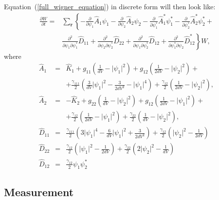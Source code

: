 \documentclass[12pt,notitlepage]{report}
\begin{document}
Equation~(\ref{full_wigner_equation}) in discrete form will then look like:
\begin{equation*}
\begin{split}
\frac{\partial W}{\partial t} = & \sum\limits_{\mathbf{r}} \left\{
	- \frac{\partial}{\partial \psi_1} \hat{A}_1 \psi_1 -
	\frac{\partial}{\partial \psi_2} \hat{A}_2 \psi_2 -
	\frac{\partial}{\partial \psi^*_1} \hat{A}^*_1 \psi^*_1 -
	\frac{\partial}{\partial \psi^*_2} \hat{A}^*_2 \psi^*_2 +
\right. \\
& \left.
	\frac{\partial^2}{\partial \psi_1 \partial \psi_1^*} \hat{D}_{11} +
	\frac{\partial^2}{\partial \psi_2 \partial \psi_2^*} \hat{D}_{22} +
	\frac{\partial^2}{\partial \psi_1 \partial \psi_2^*} \hat{D}_{12} +
	\frac{\partial^2}{\partial \psi_1^* \partial \psi_2} \hat{D}^*_{12}
\right\} W,
\end{split}
\end{equation*}
where
\begin{eqnarray*}
\hat{A}_1 & = & \hat{K}_1 + g_{11} \left( \frac{1}{dV} - \lvert \psi_1 \rvert^2 \right) +
g_{12} \left( \frac{1}{2 dV} - \lvert \psi_2 \rvert^2 \right) + \\
& & +\frac{\gamma_{111}}{2} \left( \frac{3}{dV} \lvert \psi_1 \rvert^2 - \frac{3}{2 dV^2} - \lvert \psi_1 \rvert^4 \right) +
\frac{\gamma_{12}}{2} \left( \frac{1}{2 dV} - \lvert \psi_2 \rvert^2 \right), \\
\hat{A}_2 & = & - \hat{K}_2 + g_{22} \left( \frac{1}{dV} - \lvert \psi_2 \rvert^2 \right) +
g_{12} \left( \frac{1}{2 dV} - \lvert \psi_1 \rvert^2 \right) + \\
& & + \frac{\gamma_{12}}{2} \left( \frac{1}{2 dV} - \lvert \psi_1 \rvert^2 \right) +
\frac{\gamma_{22}}{2} \left( \frac{1}{dV} - \lvert \psi_2 \rvert^2 \right), \\
\hat{D}_{11} & = & \frac{\gamma_{111}}{2} \left(3 \lvert \psi_1 \rvert^4 -
\frac{6}{dV} \lvert \psi_1 \rvert^2 + \frac{3}{2 dV^2} \right) + \frac{\gamma_{12}}{2} \left( \lvert \psi_2 \rvert^2 - \frac{1}{2 dV} \right) \\
\hat{D}_{22} & = & \frac{\gamma_{12}}{2} \left( \lvert \psi_1 \rvert^2 - \frac{1}{2 dV} \right) +
\frac{\gamma_{22}}{2} \left( 2 \lvert \psi_2 \rvert^2 - \frac{1}{dV} \right) \\
\hat{D}_{12} & = & \frac{\gamma_{12}}{2} \psi_1 \psi_2^*
\end{eqnarray*}

\subsection*{Measurement}
\end{document}
